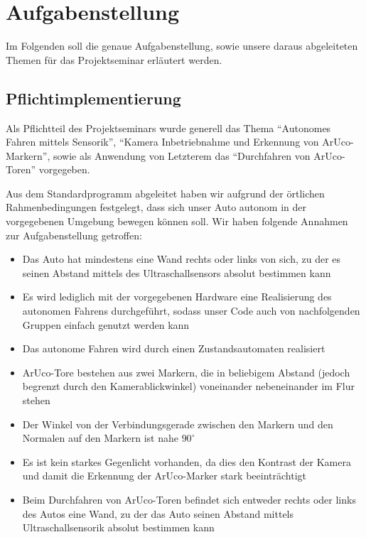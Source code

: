 \section{Aufgabenstellung}
\label{sec:aufgabenstellung}

Im Folgenden soll die genaue Aufgabenstellung, sowie unsere daraus abgeleiteten Themen für das Projektseminar erläutert werden.

\subsection{Pflichtimplementierung}
Als Pflichtteil des Projektseminars wurde generell das Thema "`Autonomes Fahren mittels Sensorik"', "`Kamera Inbetriebnahme und Erkennung von ArUco-Markern"', sowie als Anwendung von Letzterem das "`Durchfahren von ArUco-Toren"' vorgegeben.  

Aus dem Standardprogramm abgeleitet haben wir aufgrund der örtlichen Rahmenbedingungen festgelegt, dass sich unser Auto autonom in der vorgegebenen Umgebung bewegen können soll. 
Wir haben folgende Annahmen zur Aufgabenstellung getroffen:
\begin{itemize}
	\item Das Auto hat mindestens eine Wand rechts oder links von sich, zu der es seinen Abstand mittels des Ultraschallsensors absolut bestimmen kann
	\item Es wird lediglich mit der vorgegebenen Hardware eine Realisierung des autonomen Fahrens durchgeführt, sodass unser Code auch von nachfolgenden Gruppen einfach genutzt werden kann
	\item Das autonome Fahren wird durch einen Zustandsautomaten realisiert
	\item ArUco-Tore bestehen aus zwei Markern, die in beliebigem Abstand (jedoch begrenzt durch den Kamerablickwinkel) voneinander nebeneinander im Flur stehen
	\item Der Winkel von der Verbindungsgerade zwischen den Markern und den Normalen auf den Markern ist nahe $90^\circ$
	\item Es ist kein starkes Gegenlicht vorhanden, da dies den Kontrast der Kamera und damit die Erkennung der ArUco-Marker stark beeinträchtigt
	\item Beim Durchfahren von ArUco-Toren befindet sich entweder rechts oder links des Autos eine Wand, zu der das Auto seinen Abstand mittels Ultraschallsensorik absolut bestimmen kann
\end{itemize}

